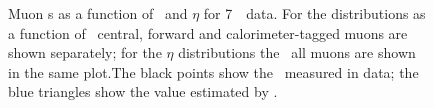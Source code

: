 \begin{figure}[h]
\centering
\vspace{-8mm}
    \caption[Muon \FakeFactor s as a function of \pt\ and $\eta$ for 7~\tev\ data.]
    {Muon \FakeFactor s as a function of \pt\ and $\eta$ for 7~\tev\ data. 
    For the distributions as a function of \pt\, central, forward and calorimeter-tagged muons are shown
    separately; for the $\eta$ distributions the \ffactor\ all muons are
    shown in the same plot.The black points show the \ffactor\ measured in
    data; the blue triangles show the value estimated by \mc.}
\label{fig:ff-mu-seven} 
\end{figure}

